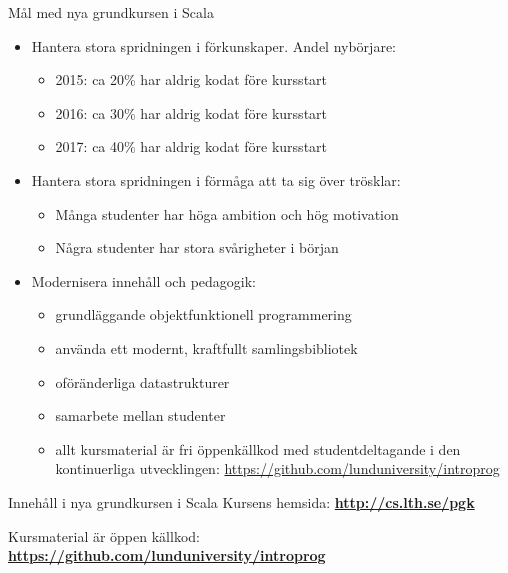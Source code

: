 \begin{Slide}{Mål med nya grundkursen i Scala}
\begin{itemize}
  \item Hantera stora spridningen i förkunskaper. Andel nybörjare:
  \begin{itemize}
    \item 2015: ca 20\% har aldrig kodat före kursstart
    \item 2016: ca 30\% har aldrig kodat före kursstart
    \item 2017: ca 40\% har aldrig kodat före kursstart
  \end{itemize}
  \item Hantera stora spridningen i förmåga att ta sig över trösklar:
  \begin{itemize}
    \item Många studenter har höga ambition och hög motivation
    \item Några studenter har stora svårigheter i början
  \end{itemize}
  \item Modernisera innehåll och pedagogik:
  \begin{itemize}
    \item grundläggande objektfunktionell programmering
    \item använda ett modernt, kraftfullt samlingsbibliotek
    \item oföränderliga datastrukturer
    \item samarbete mellan studenter
    \item allt kursmaterial är fri öppenkällkod med studentdeltagande i den kontinuerliga utvecklingen:
    \url{https://github.com/lunduniversity/introprog}
  \end{itemize}
\end{itemize}
\end{Slide}


\begin{Slide}{Innehåll i nya grundkursen i Scala}\SlideFontTiny
Kursens hemsida: \textbf{\url{http://cs.lth.se/pgk}} \\ \vspace{1em}

\noindent\resizebox{0.8\columnwidth}{!}{\fontsize{8}{10}\selectfont

}

\vspace{1em}
Kursmaterial är öppen källkod: \textbf{\url{https://github.com/lunduniversity/introprog}}
\end{Slide}




